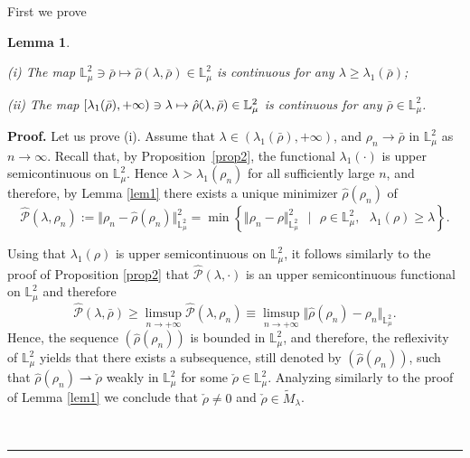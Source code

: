 \documentclass[12pt,thmsa]{article}
\newtheorem{lemma}[theorem]{Lemma}
\newenvironment{proof}[1][Proof]{\noindent\textbf{#1.} }{\ \rule{0.5em}{0.5em}}
\begin{document}
First we prove

\begin{lemma}
\label{lem51}

(i) The map $\mathbb{L}^{2}_{\mu} \ni \bar{\rho} \mapsto \hat{\rho}(\lambda,%
\bar{\rho}) \in \mathbb{L}^{2}_{\mu}$ is continuous for any $\lambda \geq
\lambda_1(\bar{\rho})$;

(ii) The map $[\lambda _{1}(\bar{\rho}),+\infty )\ni \lambda \mapsto \hat{%
\rho}(\lambda ,\bar{\rho})\in \mathbb{L}_{\mu }^{2}$ is continuous for any $%
\bar{\rho}\in \mathbb{L}_{\mu }^{2}$.
\end{lemma}

\begin{proof}
Let us prove (i). Assume that $\lambda \in (\lambda _{1}(\bar{\rho}),+\infty
)$, and $\rho _{n}\rightarrow \bar{\rho}$ in $\mathbb{L}_{\mu }^{2}$ as $%
n\rightarrow \infty $. Recall that, by Proposition~\ref{prop2}, the
functional $\lambda _{1}(\cdot )$ is upper semicontinuous on $\mathbb{L}%
_{\mu }^{2}$. Hence $\lambda >\lambda _{1}(\rho _{n})$ for all sufficiently
large $n$, and therefore, by Lemma \ref{lem1} there exists a unique
minimizer $\hat{\rho}(\rho _{n})$ of
\begin{equation*}
\hat{\mathcal{P}}(\lambda ,\rho _{n}):=\Vert \rho _{n}-\hat{\rho}(\rho
_{n})\Vert _{\mathbb{L}_{\mu }^{2}}^{2}=\min \left\{ \Vert \rho _{n}-\rho
\Vert _{\mathbb{L}_{\mu }^{2}}^{2}\text{ }|\text{\ }\rho \in \mathbb{L}_{\mu
}^{2},\text{ }\lambda _{1}(\rho )\geq \lambda \right\} .
\end{equation*}

Using that $\lambda _{1}(\rho )$ is upper semicontinuous on $\mathbb{L}_{\mu
}^{2}$, it follows similarly to the proof of Proposition \ref{prop2} that $%
\hat{\mathcal{P}}(\lambda ,\cdot )$ is an upper semicontinuous functional on
$\mathbb{L}_{\mu }^{2}$ and therefore
\begin{equation}
\hat{\mathcal{P}}(\lambda ,\bar{\rho})\geq \limsup_{n\rightarrow +\infty }%
\hat{\mathcal{P}}(\lambda ,\rho _{n})\equiv \limsup_{n\rightarrow +\infty
}\Vert \hat{\rho}(\rho _{n})-\rho _{n}\Vert _{\mathbb{L}_{\mu }^{2}}.
\label{eq:mathcaP_conv}
\end{equation}%
Hence, the sequence $(\hat{\rho}(\rho _{n}))$ is bounded in $\mathbb{L}_{\mu
}^{2}$, and therefore, the reflexivity of $\mathbb{L}_{\mu }^{2}$ yields
that there exists a subsequence, still denoted by $(\hat{\rho}(\rho _{n}))$,
such that $\hat{\rho}(\rho _{n})\rightharpoonup \check{\rho}$ weakly in $%
\mathbb{L}_{\mu }^{2}$ for some $\check{\rho}\in \mathbb{L}_{\mu }^{2}$.
Analyzing similarly to the proof of Lemma \ref{lem1} we conclude that $%
\check{\rho}\neq 0$ and $\check{\rho}\in \tilde{M}_{\lambda }$.


\end{proof}
\end{document}

